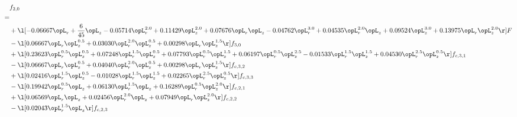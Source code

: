 \begin{alignat}{2} 
\label{eq:f_20_2} 
& f_{2,0} \nonumber \\ 
 = \\ 
& + \l[  -0.06667 \opL_r + \frac{6}{45} \opL_z   -0.05714 \opL_r^{2.0} +  0.11429 \opL_z^{2.0} +  0.07676 \opL_r \opL_z   -0.04762 \opL_r^{3.0} +  0.04535 \opL_r^{2.0} \opL_z +  0.09524 \opL_z^{3.0} +  0.13975 \opL_r \opL_z^{2.0}  \r] F \nonumber \\ 
& - \l[  0.06667 \opL_r \opL_z^{0.5} +  0.03030 \opL_r^{2.0} \opL_z^{0.5} +  0.00298 \opL_r \opL_z^{1.5}  \r] f_{3,0} \nonumber \\ 
& + \l[  0.23623 \opL_r^{0.5} \opL_z^{0.5} +  0.07248 \opL_r^{1.5} \opL_z^{0.5} +  0.07793 \opL_r^{0.5} \opL_z^{1.5} +  0.06197 \opL_r^{0.5} \opL_z^{2.5}   -0.01533 \opL_r^{1.5} \opL_z^{1.5} +  0.04530 \opL_r^{2.5} \opL_z^{0.5}  \r] f_{c,3,1} \nonumber \\ 
& - \l[  0.06667 \opL_r \opL_z^{0.5} +  0.04040 \opL_r^{2.0} \opL_z^{0.5} +  0.00298 \opL_r \opL_z^{1.5}  \r] f_{c,3,2} \nonumber \\ 
& + \l[  0.02416 \opL_r^{1.5} \opL_z^{0.5}   -0.01028 \opL_r^{1.5} \opL_z^{1.5} +  0.02265 \opL_r^{2.5} \opL_z^{0.5}  \r] f_{c,3,3} \nonumber \\ 
& - \l[  0.19942 \opL_r^{0.5} \opL_z +  0.06130 \opL_r^{1.5} \opL_z +  0.16289 \opL_r^{0.5} \opL_z^{2.0}  \r] f_{c,2,1} \nonumber \\ 
& + \l[  0.06569 \opL_r \opL_z +  0.02456 \opL_r^{2.0} \opL_z +  0.07949 \opL_r \opL_z^{2.0}  \r] f_{c,2,2} \nonumber \\ 
& - \l[  0.02043 \opL_r^{1.5} \opL_z  \r] f_{c,2,3} \nonumber \\ 
\end{alignat} 


